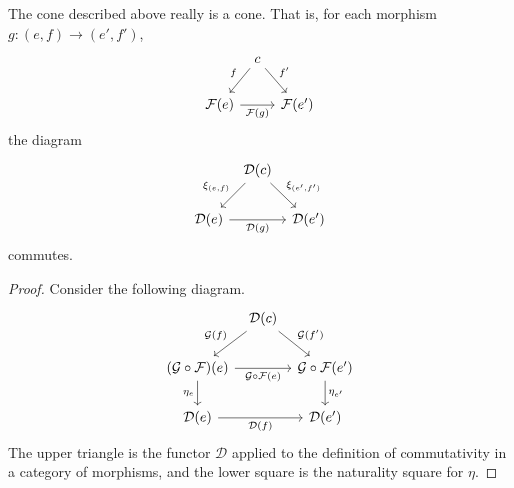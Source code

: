 \documentclass[notes.tex]{subfiles}
\begin{document}
\begin{lemma}
  \label{lemma:right_extension_induces_cone}
  The cone described above really is a cone. That is, for each morphism $g\colon (e, f) \to (e', f')$,
  \begin{equation*}
    \begin{tikzcd}[column sep=tiny]
      & c
      \arrow[ld, swap, "f"]
      \arrow[rd, "f'"]
      \\
      \mathcal{F}(e)
      \arrow[rr, swap, "\mathcal{F}(g)"]
      && \mathcal{F}(e')
    \end{tikzcd}
  \end{equation*}
  the diagram
  \begin{equation*}
    \begin{tikzcd}[column sep=tiny]
      & \mathcal{D}(c)
      \arrow[dl, swap, "\xi_{(e, f)}"]
      \arrow[dr, "\xi_{(e', f')}"]
      \\
      \mathcal{D}(e)
      \arrow[rr, swap, "\mathcal{D}(g)"]
      && \mathcal{D}(e')
    \end{tikzcd}
  \end{equation*}
  commutes.
\end{lemma}
\begin{proof}
  Consider the following diagram.
  \begin{equation*}
    \begin{tikzcd}[column sep=tiny]
      & \mathcal{D}(c)
      \arrow[ld, swap, "\mathcal{G}(f)"]
      \arrow[rd, "\mathcal{G}(f')"]
      \\
      (\mathcal{G} \circ \mathcal{F})(e)
      \arrow[rr, swap, "\mathcal{G} \circ \mathcal{F}(e)"]
      \arrow[d, swap, "\eta_{e}"]
      && \mathcal{G} \circ \mathcal{F}(e')
      \arrow[d, "\eta_{e'}"]
      \\
      \mathcal{D}(e)
      \arrow[rr, swap, "\mathcal{D}(f)"]
      &&\mathcal{D}(e')
    \end{tikzcd}
  \end{equation*}
  The upper triangle is the functor $\mathcal{D}$ applied to the definition of commutativity in a category of morphisms, and the lower square is the naturality square for $\eta$.
\end{proof}
\end{document}
